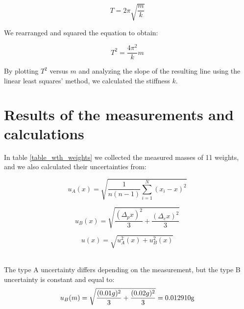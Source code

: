 \documentclass[a4paper,12pt,titlepage,bibliography=numbered]{article}
\begin{document}
\begin{equation}
    T = 2 \pi \sqrt{\frac{m}{k}}
\end{equation}

\noindent We rearranged and squared the equation to obtain:

\begin{equation}
    T^2 = \frac{4 \pi^2}{k}m
    \label{T_squered}
\end{equation}

\noindent By plotting $T^2$ versus $m$ and analyzing the slope of the resulting line using the linear least squares’ method, we calculated the stiffness $k$.

\section{Results of the measurements and calculations}

In table \ref{table_wth_weights} we collected the measured masses of 11 weights, and we also calculated their uncertainties from:

\begin{equation}
    u_A(x) = \sqrt{\frac{1}{n(n-1)}\sum_{i=1}^N(x_i-x)^2}
    \label{mass_uncertainty_A}
\end{equation}

\begin{equation}
    u_B(x) = \sqrt{\frac{(\Delta_p x)^2}{3} + \frac{(\Delta_e x)^2}{3}}
    \label{mass_uncertainty_B}
\end{equation}

\begin{equation}
    u(x) = \sqrt{u_A^2(x) + u_B^2(x)}
    \label{mass_uncertainty}
\end{equation}

\noindent \\The type A uncertainty differs depending on the measurement, but the type B uncertainty is constant and equal to: \\

\begin{equation}
    u_B(m) = \sqrt{\frac{(0.01 g)^2}{3} + \frac{(0.02 g)^2}{3}} = 0.012910 \mathrm{g} \\
\end{equation}
\end{document}
